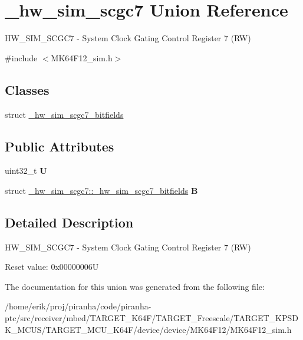 \hypertarget{union__hw__sim__scgc7}{}\section{\+\_\+hw\+\_\+sim\+\_\+scgc7 Union Reference}
\label{union__hw__sim__scgc7}


H\+W\+\_\+\+S\+I\+M\+\_\+\+S\+C\+G\+C7 -\/ System Clock Gating Control Register 7 (RW)  




{\ttfamily \#include $<$M\+K64\+F12\+\_\+sim.\+h$>$}

\subsection*{Classes}
\begin{DoxyCompactItemize}
\item 
struct \hyperlink{struct__hw__sim__scgc7_1_1__hw__sim__scgc7__bitfields}{\+\_\+hw\+\_\+sim\+\_\+scgc7\+\_\+bitfields}
\end{DoxyCompactItemize}
\subsection*{Public Attributes}
\begin{DoxyCompactItemize}
\item 
uint32\+\_\+t {\bfseries U}\hypertarget{union__hw__sim__scgc7_a40de81c4088879923112a2e155f84b98}{}\label{union__hw__sim__scgc7_a40de81c4088879923112a2e155f84b98}

\item 
struct \hyperlink{struct__hw__sim__scgc7_1_1__hw__sim__scgc7__bitfields}{\+\_\+hw\+\_\+sim\+\_\+scgc7\+::\+\_\+hw\+\_\+sim\+\_\+scgc7\+\_\+bitfields} {\bfseries B}\hypertarget{union__hw__sim__scgc7_af01677406fcc6fb00f6f937ebb1a6fab}{}\label{union__hw__sim__scgc7_af01677406fcc6fb00f6f937ebb1a6fab}

\end{DoxyCompactItemize}


\subsection{Detailed Description}
H\+W\+\_\+\+S\+I\+M\+\_\+\+S\+C\+G\+C7 -\/ System Clock Gating Control Register 7 (RW) 

Reset value\+: 0x00000006U 

The documentation for this union was generated from the following file\+:\begin{DoxyCompactItemize}
\item 
/home/erik/proj/piranha/code/piranha-\/ptc/src/receiver/mbed/\+T\+A\+R\+G\+E\+T\+\_\+\+K64\+F/\+T\+A\+R\+G\+E\+T\+\_\+\+Freescale/\+T\+A\+R\+G\+E\+T\+\_\+\+K\+P\+S\+D\+K\+\_\+\+M\+C\+U\+S/\+T\+A\+R\+G\+E\+T\+\_\+\+M\+C\+U\+\_\+\+K64\+F/device/device/\+M\+K64\+F12/M\+K64\+F12\+\_\+sim.\+h\end{DoxyCompactItemize}
